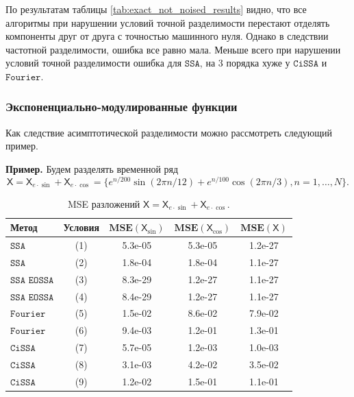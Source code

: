 \documentclass[12pt, specialist, subf
]{disser}
\theoremstyle{definition}
\newcommand{\SSA}{\texttt{SSA}}
\newcommand{\EOSSA}{\texttt{SSA EOSSA}}
\newcommand{\CISSA}{\texttt{CiSSA}}
\newcommand{\FOURIER}{\texttt{Fourier}}
\newcommand{\TS}{\mathsf{X}}
\newcommand{\MSE}{\textbf{MSE}}
\begin{document}
По результатам таблицы \ref{tab:exact_not_noised_results} видно, что все алгоритмы при нарушении условий точной разделимости перестают отделять компоненты друг от друга с точностью машинного нуля. Однако в следствии частотной разделимости, ошибка все равно мала. Меньше всего при нарушении условий точной разделимости ошибка для $\SSA$, на 3 порядка хуже у $\CISSA$ и $\FOURIER$.



\subsubsection{Экспоненциально-модулированные функции}


Как следствие асимптотической разделимости можно рассмотреть следующий пример.

\textbf{\large{Пример.}} Будем разделять временной ряд 
\[ 
\TS = \TS_{e \cdot \sin} + \TS_{e \cdot \cos} = \{e^{n/200}\sin(2\pi n/12) + e^{n/100}\cos(2\pi n/3), n = 1, \dots, N\}.
\]

\begin{table}[H]
\centering
\caption{MSE разложений \(\TS = \TS_{e \cdot \sin} + \TS_{e \cdot \cos}\).}
\label{tab:exp_mod_results}
\begin{tabular}{l|c|ccc}
  \hline
  \textbf{Метод} & \textbf{Условия} & \(\MSE(\TS_{\sin})\) & \(\MSE(\TS_{\cos})\) & \(\MSE(\TS)\) \\ 
  \hline
  $\SSA$    & (1) & 5.3e-05 & 5.3e-05 & 1.2e-27 \\ 
  $\SSA$    & (2) & 1.8e-04 & 1.8e-04 & 1.1e-27 \\ 
  \hline
  $\EOSSA$  & (3) & 8.3e-29 & 1.2e-27 & 1.1e-27 \\ 
  $\EOSSA$  & (4) & 8.4e-29 & 1.2e-27 & 1.1e-27 \\ 
  \hline
  $\FOURIER$    & (5) & 1.5e-02 & 8.6e-02 & 7.9e-02 \\ 
  $\FOURIER$ & (6) & 9.4e-03 & 1.2e-01 & 1.3e-01 \\ 
  \hline
  $\CISSA$  & (7) & 5.7e-05 & 1.2e-03 & 1.0e-03 \\ 
  $\CISSA$ & (8) & 3.1e-03 & 4.2e-02 & 3.5e-02 \\ 
  $\CISSA$ & (9) & 1.2e-02 & 1.5e-01 & 1.1e-01 \\ 
  \hline
\end{tabular}
\end{table}
\end{document}
